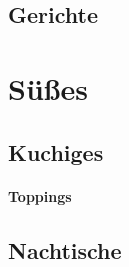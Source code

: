     \chapter{Gerichte}
%
    
    \newpage
    
    \newpage
    
    \newpage
    
    \newpage
    
    \newpage
    
    \newpage


    \part{Süßes}


    \chapter{Kuchiges}
    
    \newpage
    
    \subsection*{Toppings}
    
    
%
    \newpage
    
    \newpage
    
    \newpage
    
    \newpage
    
%


    \chapter{Nachtische}
    
    \newpage
%
    \ClearShipoutPicture
    

